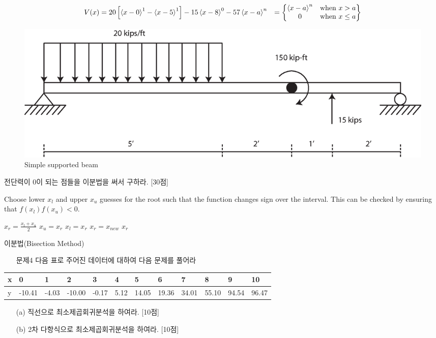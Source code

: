 \documentclass[a4,10pt]{article}
\theoremstyle{examplestyle}
\let\\\tabularnewline
\let\\\tabularnewline
\begin{document}
\begin{align*}
V(x)&=20\left[\left<x-0\right>^{1}-\left<x-5\right>^{1}\right]-15\left<x-8\right>^{0}-57\\
\left<x-a\right>^{n}&=\begin{Bmatrix}\left<x-a\right>^{n}&\text{when  } x>a\\0&\text{when  } x\leq a\end{Bmatrix}
\end{align*}
\begin{figure}[!hbpt]
\centering
\includegraphics[keepaspectratio=true,width=0.7\linewidth]{finalterm/prob2.eps}
\caption{Simple supported beam}
\label{fig:prob2}
\end{figure}
전단력이 0이 되는 점들을 이분법을 써서 구하라. [30점]
\begin{algorithm}\label{alg:c5}
Choose lower $x_{l}$ and upper $x_{u}$ guesses for the root such that the function changes sign over the interval. This can be checked by ensuring that $f(x_{l})f(x_{u})<0$.
\begin{algorithmic}
  \State $x_{r}=\frac{x_{l}+x_{u}}{2}$
    \State $x_{u}=x_{r}$
  \Else
    \State $x_{l}=x_{r}$
  \EndIf  
    \State $x_{r}=x_{new}$
    \State \Return $x_{r}$
  \EndIf
\EndWhile
\end{algorithmic}
\caption{이분법(Bisection Method)}
\end{algorithm}
\begin{itemize}
\item[문제4] 다음 표로 주어진 데이터에 대하여 다음 문제를 풀어라
\end{itemize}
\begin{table}[!hbt]
\centering
\begin{tabular}{l|lllllllllll}
\hline\hline
x&0&1&2&3&4&5&6&7&8&9&10\\
\hline
y&-10.41&-4.03&-10.00&-0.17&5.12&14.05&19.36&34.01&55.10&94.54&96.47\\
\hline\hline
\end{tabular}
\end{table}
\begin{itemize}
\item[(a)] 직선으로 최소제곱회귀분석을 하여라. [10점]
\item[(b)] 2차 다항식으로 최소제곱회귀분석을 하여라. [10점]
\end{itemize}
\end{document}
